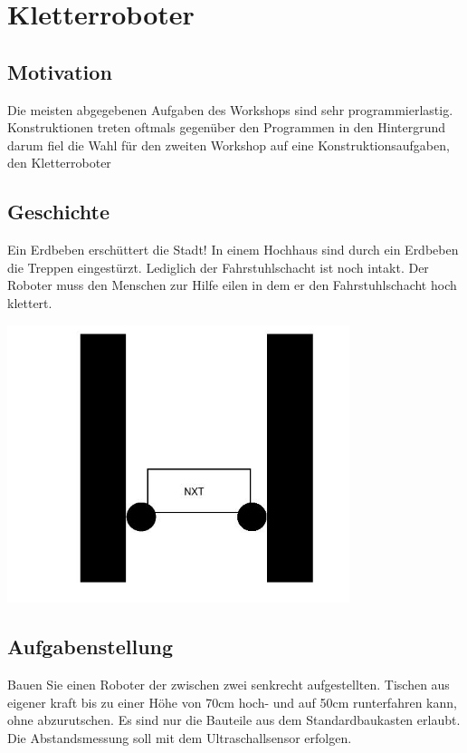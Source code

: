 \chapter{Kletterroboter}

  \section{Motivation}
    Die meisten abgegebenen Aufgaben des Workshops sind sehr programmierlastig. Konstruktionen treten oftmals gegenüber den Programmen in den Hintergrund darum fiel die Wahl für den zweiten Workshop auf eine Konstruktionsaufgaben, den Kletterroboter 


  \section{Geschichte}
    Ein Erdbeben erschüttert die Stadt! In einem Hochhaus sind durch ein Erdbeben die Treppen eingestürzt. Lediglich der Fahrstuhlschacht ist noch intakt. Der Roboter muss den Menschen zur Hilfe eilen in dem er den Fahrstuhlschacht hoch klettert.

  \begin{capfigure}[Kletterroboter]
    \includegraphics[width=10cm]{images/klettern_skizze}
  \end{capfigure}

  \section{Aufgabenstellung}
    Bauen Sie einen Roboter der zwischen zwei senkrecht aufgestellten. Tischen aus eigener kraft bis zu einer Höhe von 70cm hoch- und auf 50cm runterfahren kann, ohne abzurutschen. Es sind nur die Bauteile aus dem Standardbaukasten erlaubt. Die Abstandsmessung soll mit dem Ultraschallsensor erfolgen. 
    
